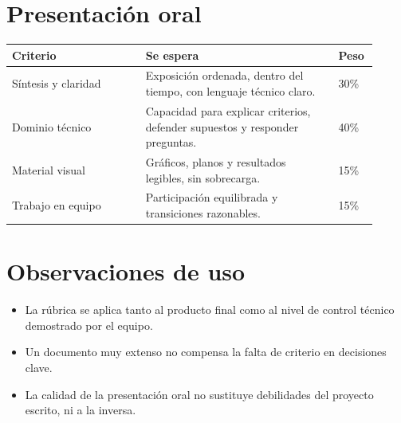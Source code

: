 \documentclass[11pt]{article}
\begin{document}
\section{Presentaci\'on oral}
\begin{center}
\begin{tabular}{p{0.34\linewidth} p{0.49\linewidth} p{0.08\linewidth}}
\toprule
\textbf{Criterio} & \textbf{Se espera} & \textbf{Peso} \\
\midrule
S\'intesis y claridad & Exposici\'on ordenada, dentro del tiempo, con lenguaje t\'ecnico claro. & 30\% \\
Dominio t\'ecnico & Capacidad para explicar criterios, defender supuestos y responder preguntas. & 40\% \\
Material visual & Gr\'aficos, planos y resultados legibles, sin sobrecarga. & 15\% \\
Trabajo en equipo & Participaci\'on equilibrada y transiciones razonables. & 15\% \\
\bottomrule
\end{tabular}
\end{center}

\section{Observaciones de uso}
\begin{itemize}
\item La r\'ubrica se aplica tanto al producto final como al nivel de control t\'ecnico demostrado por el equipo.
\item Un documento muy extenso no compensa la falta de criterio en decisiones clave.
\item La calidad de la presentaci\'on oral no sustituye debilidades del proyecto escrito, ni a la inversa.
\end{itemize}
\end{document}

